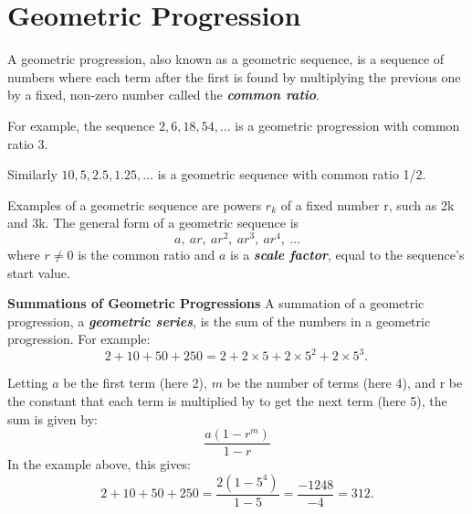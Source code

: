 

\section{Geometric Progression}
A geometric progression, also known as a geometric sequence, is a sequence of numbers where each term after the first is found by multiplying the previous one by a fixed, non-zero number called the \textit{\textbf{common ratio}}. 

\noindent For example, the sequence $2, 6, 18, 54, \ldots$ is a geometric progression with common ratio 3. 

\noindent Similarly $10, 5, 2.5, 1.25, \ldots$ is a geometric sequence with common ratio 1/2.





\noindent Examples of a geometric sequence are powers $r_k$ of a fixed number r, such as 2k and 3k. The general form of a geometric sequence is
\[a,\ ar,\ ar^{2},\ ar^{3},\ ar^{4},\ \ldots \]
where $r \neq 0$ is the common ratio and $a$ is a \textit{\textbf{scale factor}}, equal to the sequence's start value.


\textbf{Summations of Geometric Progressions}
A summation of a geometric progression, a \textit{\textbf{geometric series}}, is the sum of the numbers in a geometric progression. For example:
\[2+10+50+250=2+2\times 5+2\times 5^{2}+2\times 5^{3}.\,\]


Letting $a$ be the first term (here 2), $m$ be the number of terms (here 4), and r be the constant that each term is multiplied by to get the next term (here 5), the sum is given by:
\[{\frac  {a(1-r^{m})}{1-r}}\]
In the example above, this gives:
\[2+10+50+250={\frac  {2(1-5^{4})}{1-5}}={\frac  {-1248}{-4}}=312.\]



